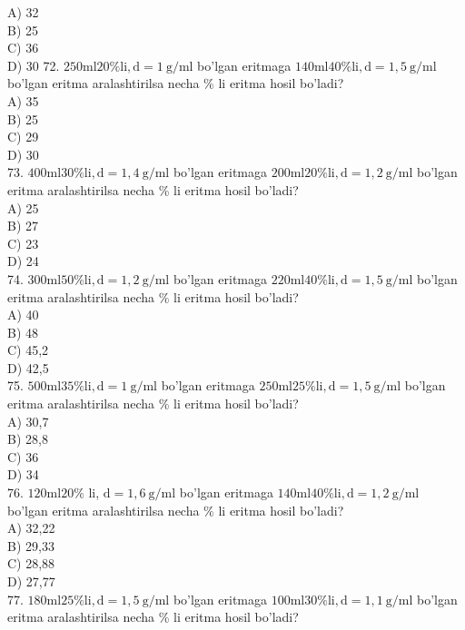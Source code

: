 A) 32\\
B) 25\\
C) 36\\
D) 30
72. $250 \mathrm{ml} 20 \% \mathrm{li}, \mathrm{d}=1 \mathrm{~g} / \mathrm{ml}$ bo'lgan eritmaga $140 \mathrm{ml} 40 \% \mathrm{li}, \mathrm{d}=1,5 \mathrm{~g} / \mathrm{ml}$ bo'lgan eritma aralashtirilsa necha \% li eritma hosil bo'ladi?\\
A) 35\\
B) 25\\
C) 29\\
D) 30\\
73. $400 \mathrm{ml} 30 \% \mathrm{li}, \mathrm{d}=1,4 \mathrm{~g} / \mathrm{ml}$ bo'lgan eritmaga $200 \mathrm{ml} 20 \% \mathrm{li}, \mathrm{d}=1,2 \mathrm{~g} / \mathrm{ml}$ bo'lgan eritma aralashtirilsa necha \% li eritma hosil bo'ladi?\\
A) 25\\
B) 27\\
C) 23\\
D) 24\\
74. $300 \mathrm{ml} 50 \% \mathrm{li}, \mathrm{d}=1,2 \mathrm{~g} / \mathrm{ml}$ bo'lgan eritmaga $220 \mathrm{ml} 40 \% \mathrm{li}, \mathrm{d}=1,5 \mathrm{~g} / \mathrm{ml}$ bo'lgan eritma aralashtirilsa necha \% li eritma hosil bo'ladi?\\
A) 40\\
B) 48\\
C) 45,2\\
D) 42,5\\
75. $500 \mathrm{ml} 35 \% \mathrm{li}, \mathrm{d}=1 \mathrm{~g} / \mathrm{ml}$ bo'lgan eritmaga $250 \mathrm{ml} 25 \% \mathrm{li}, \mathrm{d}=1,5 \mathrm{~g} / \mathrm{ml}$ bo'lgan eritma aralashtirilsa necha \% li eritma hosil bo'ladi?\\
A) 30,7\\
B) 28,8\\
C) 36\\
D) 34\\
76. $120 \mathrm{ml} 20 \%$ li, $\mathrm{d}=1,6 \mathrm{~g} / \mathrm{ml}$ bo'lgan eritmaga $140 \mathrm{ml} 40 \% \mathrm{li}, \mathrm{d}=1,2 \mathrm{~g} / \mathrm{ml}$\\
bo'lgan eritma aralashtirilsa necha \% li eritma hosil bo'ladi?\\
A) 32,22\\
B) 29,33\\
C) 28,88\\
D) 27,77\\
77. $180 \mathrm{ml} 25 \% \mathrm{li}, \mathrm{d}=1,5 \mathrm{~g} / \mathrm{ml}$ bo'lgan eritmaga $100 \mathrm{ml} 30 \% \mathrm{li}, \mathrm{d}=1,1 \mathrm{~g} / \mathrm{ml}$ bo'lgan eritma aralashtirilsa necha \% li eritma hosil bo'ladi?\\
